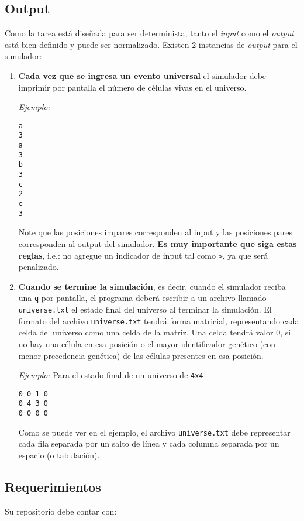 \documentclass[letterpaper,10pt]{article}
\begin{document}
\subsection{Output}
Como la tarea está diseñada para ser determinista, tanto el \emph{input} como el \emph{output} está bien definido y puede ser normalizado. Existen 2 instancias de \emph{output} para el simulador:

\begin{enumerate}
	\item \textbf{Cada vez que se ingresa un evento universal} el simulador debe imprimir por pantalla el número de células vivas en el universo.

\emph{Ejemplo:}
\begin{lstlisting}
a
3
a
3
b
3
c
2
e
3
\end{lstlisting}

Note que las posiciones impares corresponden al input y las posiciones pares corresponden al output del simulador. \textbf{Es muy importante que siga estas reglas}, i.e.: no agregue un indicador de input tal como \texttt{>}, ya que será penalizado.

\item \textbf{Cuando se termine la simulación}, es decir, cuando el simulador reciba una \texttt{q} por pantalla, el programa deberá escribir a un archivo llamado \texttt{universe.txt} el estado final del universo al terminar la simulación. El formato del archivo \texttt{universe.txt} tendrá forma matricial, representando cada celda del universo como una celda de la matriz. Una celda tendrá valor 0, si no hay una célula en esa posición o el mayor identificador genético (con menor precedencia genética) de las células presentes en esa posición.

\emph{Ejemplo:} Para el estado final de un universo de \texttt{4x4}

\begin{lstlisting}
0 0 1 0
0 4 3 0
0 0 0 0
\end{lstlisting}

Como se puede ver en el ejemplo, el archivo \texttt{universe.txt} debe representar cada fila separada por un salto de línea y cada columna separada por un espacio (o tabulación).
\end{enumerate}



\subsection{Requerimientos}
Su repositorio debe contar con:
\end{document}
